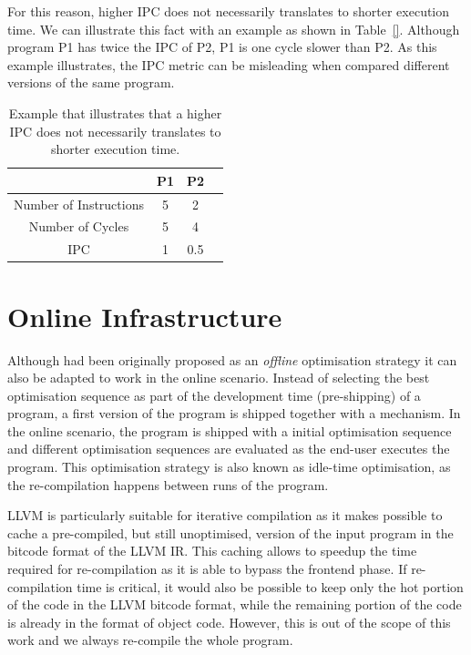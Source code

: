 For this reason, higher IPC does not necessarily translates to shorter execution time.
We can illustrate this fact with an example as shown in Table~\ref{}.
Although program P1 has twice the IPC of P2, P1 is one cycle slower than P2.
As this example illustrates, the IPC metric can be misleading when compared different versions of the same program.

\begin{table}[h]
\centering
\begin{tabular}{|c|c|c|c|}
\hline
                       & P1 & P2  \\
\hline
Number of Instructions & 5  & 2   \\
Number of Cycles       & 5  & 4   \\
IPC                    & 1  & 0.5 \\
\hline
\end{tabular}
\caption{Example that illustrates that a higher IPC does not necessarily translates to shorter execution time.}
\label{tab:ipc-example}
\end{table}

\section{Online {\IterComp} Infrastructure} \label{sec:oic-infra}

Although {\itercomp} had been originally proposed as an \textit{offline} optimisation strategy it can also be adapted to work in the online scenario.
Instead of selecting the best optimisation sequence as part of the development time (pre-shipping) of a program, a first version of the program is shipped together with a {\itercomp} mechanism.
In the online scenario, the program is shipped with a initial optimisation sequence and different optimisation sequences are evaluated as the end-user executes the program.
This optimisation strategy is also known as idle-time optimisation, as the re-compilation happens between runs of the program.

LLVM is particularly suitable for iterative compilation as it makes possible to cache a pre-compiled, but still unoptimised, version of the input program in the bitcode format of the LLVM IR.  
This caching allows to speedup the time required for re-compilation as it is able to bypass the frontend phase.
If re-compilation time is critical, it would also be possible to keep only the hot portion of the code in the LLVM bitcode format, while the remaining portion of the code is already in the format of object code.
However, this is out of the scope of this work and we always re-compile the whole program.

